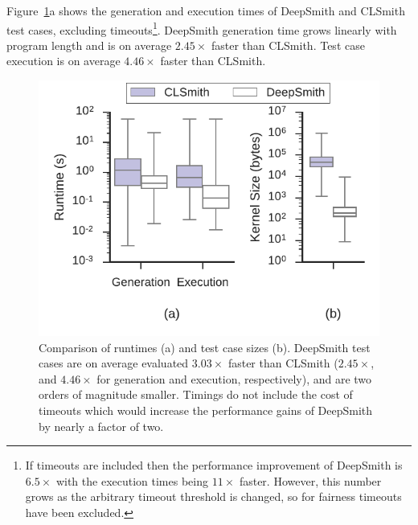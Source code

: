 \begin{table}
  \centering %
  \caption[Results from 48 hours of testing using DeepSmith]{%
    Results from 48 hours of testing using DeepSmith. System \#. as per Table~\ref{tab:deepsmith-platforms}. $\pm$ denotes optimisations off ($-$) vs on ($+$). The remaining columns denote the number of build crash (\bc), build timeout (\bto), anomalous build failure (\abf), anomalous runtime crash (\arc), anomalous wrong-output (\awo), and pass (\textbf{\cmark}) results.
  }
  
  \label{tab:megatable-deepsmith}
\end{table}

Figure~\ref{fig:deepsmith-vs-clsmith}a shows the generation and execution times of DeepSmith and CLSmith test cases, excluding timeouts\footnote{If timeouts are included then the performance improvement of DeepSmith is $6.5\times$ with the execution times being $11\times$ faster. However, this number grows as the arbitrary timeout threshold is changed, so for fairness timeouts have been excluded.}. DeepSmith generation time grows linearly with program length and is on average $2.45\times$ faster than CLSmith. Test case execution is on average $4.46\times$ faster than CLSmith.

\begin{figure}
  \centering %
  \includegraphics[width=.72\columnwidth]{img/deepsmith-vs-clsmith}%
  \caption[Comparison of DeepSmith and CLSmith runtimes]{%
    Comparison of runtimes (a) and test case sizes (b). DeepSmith test cases are on average evaluated $3.03\times$ faster than CLSmith ($2.45\times$, and $4.46\times$ for generation and execution, respectively), and are two orders of magnitude smaller. Timings do not include the cost of timeouts which would increase the performance gains of DeepSmith by nearly a factor of two.%
  }%
  \label{fig:deepsmith-vs-clsmith}
\end{figure}

